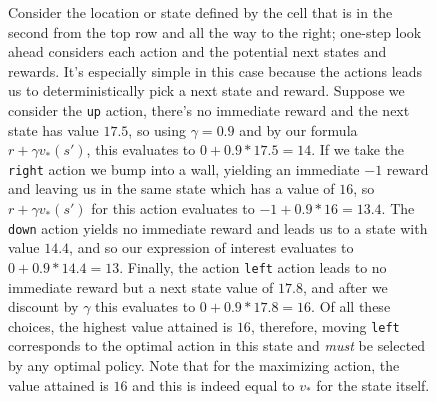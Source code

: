 \documentclass[12pt]{article}
\begin{document}
\begin{figure}[h]
  \centering
  \caption{\footnotesize Consider the location or state defined by the cell that is in the second from the top row and all the way to the right; one-step look ahead considers each action and the potential next states and rewards. It's especially simple in this case because the actions leads us to deterministically pick a next state and reward. Suppose we consider the \texttt{up} action, there's no immediate reward and the next state has value $17.5$, so using $\gamma = 0.9$ and by our formula $r+\gamma v_*(s')$, this evaluates to $0 + 0.9 * 17.5 = 14$. If we take the \texttt{right} action we bump into a wall, yielding an immediate $-1$ reward and leaving us in the same state which has a value of $16$, so
$r+\gamma v_*(s')$ for this action evaluates to $-1 + 0.9 * 16 = 13.4$. The \texttt{down} action yields no immediate reward and leads us to a state with value $14.4$, and so our expression of interest evaluates to $0 + 0.9 * 14.4 = 13$. Finally, the action \texttt{left} action leads to no immediate reward but a next state value of $17.8$, and after we discount by $\gamma$ this evaluates to $0 + 0.9 * 17.8 = 16$. Of all these choices, the highest value attained is $16$, therefore, moving \texttt{left} corresponds to the optimal action in this state and \emph{must} be selected by any optimal policy. Note that for the maximizing action, the value attained is $16$ and this is indeed equal to $v_*$ for the state itself.}
\end{figure}
\end{document}
